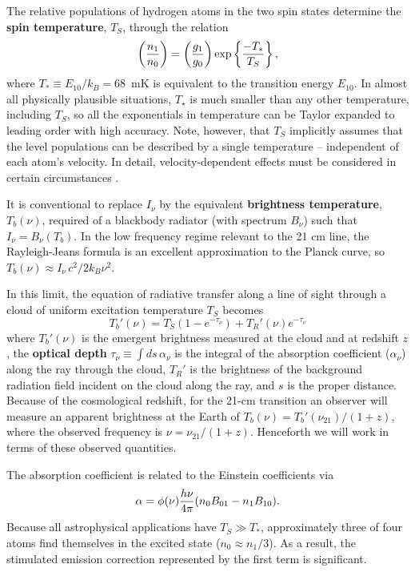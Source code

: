 \documentclass[a4paper,openany, 12pt]{book}
\begin{document}
The relative populations of hydrogen atoms in the two spin states determine the {\bf spin temperature}, $T_S$, through the relation
\begin{equation}
\left({n_1\over n_0}\right)=\left({g_1 \over g_0}\right)
\exp\left\{ {-T_*\over T_S}\right\}, 
\end{equation}
where $T_* \equiv E_{10} /k_B=68$~mK is equivalent to the transition energy $E_{10}$. In almost all physically plausible situations,  $T_\star$ is much smaller than any other temperature, including $T_S$, so all the exponentials in temperature can be Taylor expanded to leading order with high accuracy. Note, however, that $T_S$ implicitly assumes that the level populations can be described by a single temperature -- independent of each atom's velocity. In detail, velocity-dependent effects must be considered in certain circumstances \cite{hirata07}.

It is conventional to replace $I_{\nu}$ by the equivalent {\bf brightness temperature}, $T_b(\nu)$, required of a blackbody radiator (with spectrum $B_{\nu}$) such that $I_{\nu}=B_{\nu}(T_b)$. In the low frequency regime relevant to the 21 cm line, the Rayleigh-Jeans formula is an excellent approximation to the Planck curve, so $T_b(\nu)\approx I_{\nu} \, c^2/2k_B{\nu}^2$.

In this limit, the equation of radiative transfer  along a line of sight through a cloud of uniform excitation temperature $T_S$ becomes
\begin{equation}
T_b'(\nu) = T_{S}(1-e^{-\tau_{\nu}})+T_R'(\nu)e^{-\tau_{\nu}}
\label{eq:rad_trans}
\end{equation}
where $T_b'(\nu)$ is the emergent brightness measured at the cloud and at redshift $z$, the {\bf optical depth}  $\tau_\nu \equiv \int d s \, \alpha_{\nu}$ is the integral of the absorption coefficient ($\alpha_{\nu}$)  along the ray through the cloud, $T_R'$ is the brightness of the background radiation field incident on the cloud along the ray, and $s$ is the proper distance. Because of the cosmological redshift, for the 21-cm transition an observer will measure an apparent brightness at the Earth of $T_b(\nu) = T_b'(\nu_{21})/(1+z)$, where the observed frequency is $\nu=\nu_{21}/(1+z)$. Henceforth we will work in terms of these observed quantities.

The absorption coefficient is related to the Einstein coefficients via
\begin{equation}
\alpha = \phi(\nu) {h \nu \over 4 \pi} (n_0 B_{01} - n_1 B_{10}).
\end{equation}
Because all astrophysical  applications have $T_S \gg T_*$, approximately three of four atoms find themselves in the excited state ($n_0 \approx n_1/3$).  As a result, the stimulated emission correction represented by the first term is significant.  
\end{document}
